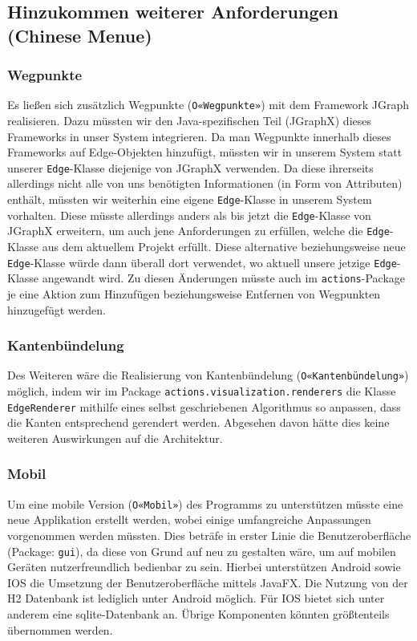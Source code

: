 \documentclass[enabledeprecatedfontcommands,fontsize=11pt,paper=a4,twoside]{scrartcl}
\newcounter{one}
\begin{document}
	\subsection{Hinzukommen weiterer Anforderungen (Chinese Menue)}
	\subsubsection{Wegpunkte}
	Es ließen sich zusätzlich Wegpunkte (\texttt{O«Wegpunkte»}) mit dem Framework JGraph realisieren. Dazu müssten wir den Java-spezifischen Teil (JGraphX) dieses Frameworks in unser System integrieren. Da man Wegpunkte innerhalb dieses Frameworks auf Edge-Objekten hinzufügt, müssten wir in unserem System statt unserer \texttt{Edge}-Klasse diejenige von JGraphX verwenden. Da diese ihrerseits allerdings nicht alle von uns benötigten Informationen (in Form von Attributen) enthält, müssten wir weiterhin eine eigene \texttt{Edge}-Klasse in unserem System vorhalten. Diese müsste allerdings anders als bis jetzt die \texttt{Edge}-Klasse von JGraphX erweitern, um auch jene Anforderungen zu erfüllen, welche die \texttt{Edge}-Klasse aus dem aktuellem Projekt erfüllt. Diese alternative beziehungsweise neue \texttt{Edge}-Klasse würde dann überall dort verwendet, wo aktuell unsere jetzige \texttt{Edge}-Klasse angewandt wird. Zu diesen Änderungen müsste auch im \texttt{actions}-Package je eine Aktion zum Hinzufügen beziehungsweise Entfernen von Wegpunkten hinzugefügt werden. \\
	
	\subsubsection{Kantenbündelung}
	Des Weiteren wäre die Realisierung von Kantenbündelung (\texttt{O«Kantenbündelung»}) möglich, indem wir im Package \texttt{actions.visualization.renderers} die Klasse \texttt{EdgeRenderer} mithilfe eines selbst geschriebenen Algorithmus so anpassen, dass die Kanten entsprechend gerendert werden. Abgesehen davon hätte dies keine weiteren Auswirkungen auf die Architektur.  \\
	
	\subsubsection{Mobil}
	Um eine mobile Version (\texttt{O«Mobil»}) des Programms zu unterstützen müsste eine neue Applikation erstellt werden, wobei einige umfangreiche Anpassungen vorgenommen werden müssten. Dies beträfe in erster Linie die Benutzeroberfläche (Package: \texttt{gui}), da diese von Grund auf neu zu gestalten wäre, um auf mobilen Geräten nutzerfreundlich bedienbar zu sein. Hierbei unterstützen Android sowie IOS die Umsetzung der Benutzeroberfläche mittels JavaFX. Die Nutzung von der H2 Datenbank ist lediglich unter Android möglich. Für IOS bietet sich unter anderem eine sqlite-Datenbank an. Übrige Komponenten könnten größtenteils übernommen werden. 
	
\end{document}
